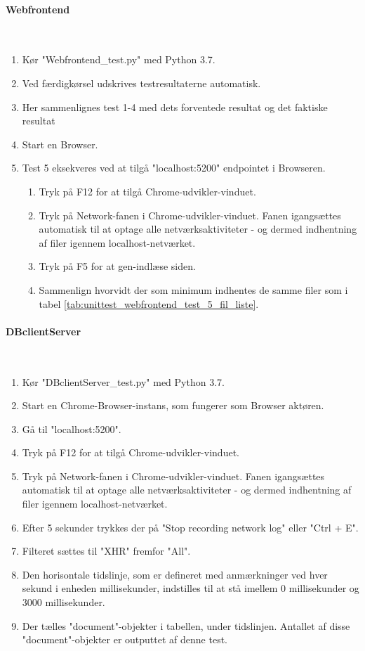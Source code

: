\begin{appendices}
\paragraph{Webfrontend} \mbox{}\\
\begin{enumerate}
	\item Kør "Webfrontend\_test.py" med Python 3.7.
	\item Ved færdigkørsel udskrives testresultaterne automatisk.
	\item Her sammenlignes test 1-4 med dets forventede resultat og det faktiske resultat
	\item Start en Browser.
	\item Test 5 eksekveres ved at tilgå "localhost:5200" endpointet i Browseren.
	\begin{enumerate}
		\item Tryk på F12 for at tilgå Chrome-udvikler-vinduet.
		\item Tryk på Network-fanen i Chrome-udvikler-vinduet. Fanen igangsættes automatisk til at optage alle netværksaktiviteter - og dermed indhentning af filer igennem localhost-netværket.
		\item Tryk på F5 for at gen-indlæse siden.
		\item Sammenlign hvorvidt der som minimum indhentes de samme filer som i tabel \ref{tab:unittest_webfrontend_test_5_fil_liste}.
	\end{enumerate}
\end{enumerate}

\pagebreak
\paragraph{DBclientServer} \mbox{}\\
\begin{enumerate}
	\item Kør "DBclientServer\_test.py" med Python 3.7.
	\item Start en Chrome-Browser-instans, som fungerer som Browser aktøren.
	\item Gå til "localhost:5200".
	\item Tryk på F12 for at tilgå Chrome-udvikler-vinduet.
	\item Tryk på Network-fanen i Chrome-udvikler-vinduet. Fanen igangsættes automatisk til at optage alle netværksaktiviteter - og dermed indhentning af filer igennem localhost-netværket.
	\item Efter 5 sekunder trykkes der på "Stop recording network log" eller "Ctrl + E".
	\item Filteret sættes til "XHR" fremfor "All".
	\item Den horisontale tidslinje, som er defineret med anmærkninger ved hver sekund i enheden millisekunder, indstilles til at stå imellem 0 millisekunder og 3000 millisekunder.
	\item Der tælles "document"-objekter i tabellen, under tidslinjen. Antallet af disse "document"-objekter er outputtet af denne test. 
\end{enumerate}


\end{appendices}
